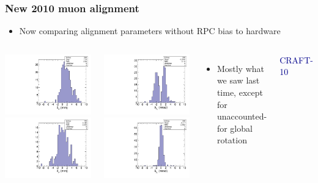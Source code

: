 \documentclass[compress]{beamer}
\begin{document}
\begin{frame}
\frametitle{New 2010 muon alignment}

\begin{itemize}
\item Now comparing alignment parameters without RPC bias to hardware
\end{itemize}

\begin{columns}
\includegraphics[width=0.5\linewidth]{08_deltax_without_RPC_and_hardware.pdf}
\includegraphics[width=0.5\linewidth]{09_deltay_without_RPC_and_hardware.pdf}

\includegraphics[width=0.5\linewidth]{10_deltaphiy_without_RPC_and_hardware.pdf}
\includegraphics[width=0.5\linewidth]{11_deltaphiz_without_RPC_and_hardware.pdf}

\begin{itemize}
\item Mostly what we saw last time, except for unaccounted-for global
  rotation
\end{itemize}

\vspace{2 cm}
\hfill \textcolor{darkblue}{\scriptsize CRAFT-10}
\end{columns}
\end{frame}
\end{document}
